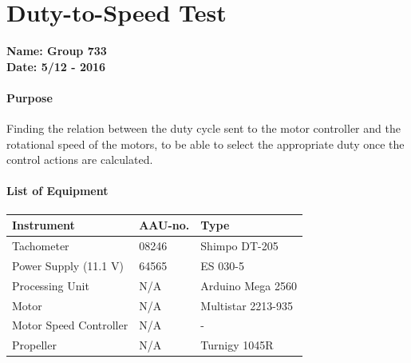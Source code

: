 \chapter{Duty-to-Speed Test}\label{app:duty} 
\textbf{Name: Group 733}\\
\textbf{Date: 5/12 - 2016}

\subsubsection{Purpose}
Finding the relation between the duty cycle sent to the motor controller and the rotational speed of the motors, to be able to select the appropriate duty once the control actions are calculated.

\subsubsection{List of Equipment}
\begin{table}[H]
    \centering
	\begin{tabular}{|l|l|p{4.3cm}|}
		\hline%
		\textbf{Instrument}                          &  \textbf{AAU-no.}  &  \textbf{Type}                       \\
		\hline%
		Tachometer                                   &  08246             &  Shimpo DT-205		                   \\
		\hline%
	    Power Supply (11.1 V)                        &  64565             &  ES 030-5                 \\
		\hline%
		Processing Unit                              &  N/A               & Arduino Mega 2560    \\
		\hline%
		Motor                                        &  N/A               & Multistar 2213-935     \\
		\hline%
		Motor Speed Controller                       &  N/A               &  -      \\
		\hline%
		Propeller                                    &  N/A               & Turnigy 1045R     \\
		\hline%
	\end{tabular}
\end{table}

